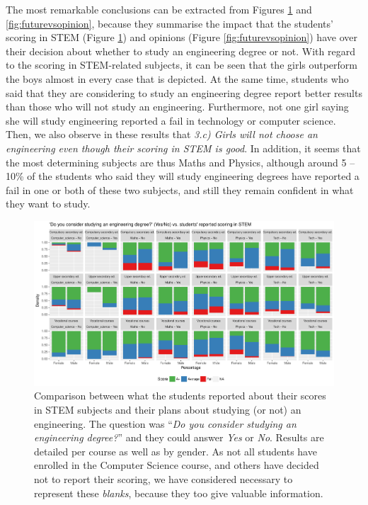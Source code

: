 \documentclass[journal,transmag]{IEEEtran}
\begin{document}
The most remarkable conclusions can be extracted from Figures \ref{fig:futurevsscore} and \ref{fig:futurevsopinion}, because they summarise the impact that the students' scoring in STEM (Figure \ref{fig:futurevsscore}) and opinions (Figure \ref{fig:futurevsopinion}) have over their decision about whether to study an engineering degree or not. With regard to the scoring in STEM-related subjects, it can be seen that the girls outperform the boys almost in every case that is depicted. At the same time, students who said that they are considering to study an engineering degree report better results than those who will not study an engineering. Furthermore, not one girl saying she will study engineering reported a fail in technology or computer science. Then, we also observe in these results that \textit{3.c) Girls will not choose an engineering even though their scoring in STEM is good}. In addition, it seems that the most determining subjects are thus Maths and Physics, although around 5 -- 10\% of the students who said they will study engineering degrees have reported a fail in one or both of these two subjects, and still they remain confident in what they want to study.

\begin{figure}
	\centering
	\includegraphics[width=1\textwidth]{img/future_vs_scoringSTEM.pdf}
	\caption{Comparison between what the students reported about their scores in STEM subjects and their plans about studying (or not) an engineering. The question was ``\textit{Do you consider studying an engineering degree?}'' and they could answer \textit{Yes} or \textit{No}. Results are detailed per course as well as by gender. As not all students have enrolled in the Computer Science course, and others have decided not to report their scoring, we have considered necessary to represent these \textit{blanks}, because they too give valuable information.}
	\label{fig:futurevsscore}
\end{figure}
\end{document}
